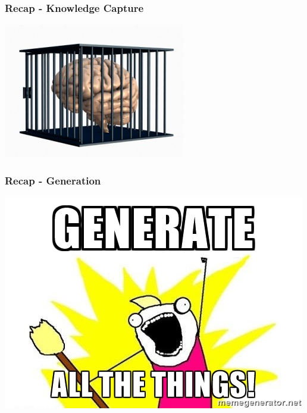 \documentclass{beamer}
\begin{document}
\begin{frame}

\frametitle{Recap - Knowledge Capture}
\begin{center}
\includegraphics[width=.8\textwidth]{KC.jpg}
\end{center}

\end{frame}


\begin{frame}

\frametitle{Recap - Generation}
\begin{center}
\includegraphics[width=\textwidth]{generate_all_the_things.jpg}
\end{center}

\end{frame}

\end{document}
